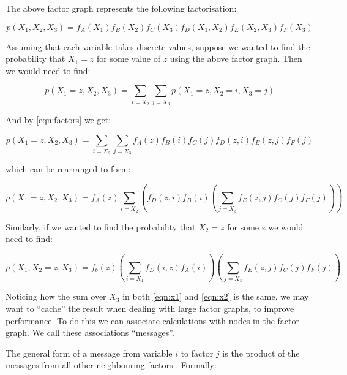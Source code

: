 The above factor graph represents the following factorisation:

\begin{equation}
    p(X_1, X_2, X_3) = f_A(X_1)f_B(X_2)f_C(X_3)f_D(X_1, X_2)f_E(X_2, X_3)f_F(X_3)
    \label{eqn:factors}
\end{equation}

Assuming that each variable takes discrete values, suppose we wanted to find the probability that $X_1 = z$ for some value of $z$ using the above factor graph. Then we would need to find:

\begin{equation}
    p(X_1 = z, X_2, X_3) = \underset{i=X_2}{\sum} \underset{j=X_3}{\sum} p(X_1 = z, X_2 = i, X_3 =j)
    \label{eqn:bp_derivation_1}
\end{equation}

And by \ref{eqn:factors} we get:

\begin{equation}
    p(X_1 = z, X_2, X_3) = \underset{i=X_2}{\sum} \underset{j=X_3}{\sum} f_A(z)f_B(i)f_C(j)f_D(z, i)f_E(z, j)f_F(j)
\end{equation}


which can be rearranged to form:

\begin{equation}
    p(X_1 = z, X_2, X_3) = f_A(z) \underset{i=X_2}{\sum} \left(f_D(z, i)f_B(i) \left(\underset{j=X_3}{\sum} f_E(z, j)f_C(j)f_F(j) \right)\right)
    \label{eqn:x1}
\end{equation}

Similarly, if we wanted to find the probability that $X_2 = z$ for some z we would need to find:

\begin{equation}
    p(X_1, X_2 = z, X_3) = f_b(z) \left(\underset{i=X_1}{\sum} f_D(i, z) f_A(i)\right) \left(\underset{j=X_3}{\sum} f_E(z, j) f_C(j) f_F(j)\right)
    \label{eqn:x2}
\end{equation}

Noticing how the sum over $X_3$ in both \ref{eqn:x1} and \ref{eqn:x2} is the same, we may want to ``cache'' the result when dealing with large factor graphs, to improve performance. To do this we can associate calculations with nodes in the factor graph. We call these associations ``messages''.

The general form of a message from variable $i$ to factor $j$ is the product of the messages from all other neighbouring factors \cite{GaussianBP}. Formally:

